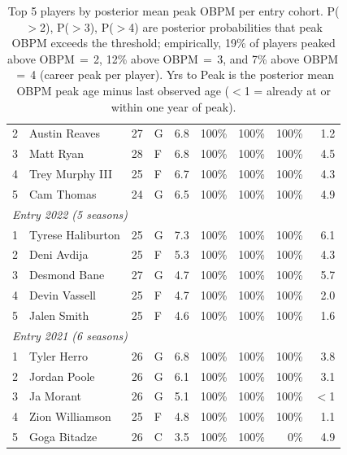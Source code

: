 \begin{table}[htbp]
\begin{tabular}{rlrlrrrrr}
    2 & Austin Reaves & 27 & G & 6.8 & 100\% & 100\% & 100\% & 1.2 \\
    3 & Matt Ryan & 28 & F & 6.8 & 100\% & 100\% & 100\% & 4.5 \\
    4 & Trey Murphy III & 25 & F & 6.7 & 100\% & 100\% & 100\% & 4.3 \\
    5 & Cam Thomas & 24 & G & 6.5 & 100\% & 100\% & 100\% & 4.9 \\
    \midrule[0.4pt]
    \multicolumn{9}{l}{\textit{Entry 2022 (5 seasons)}} \\
    \midrule
    1 & Tyrese Haliburton & 25 & G & 7.3 & 100\% & 100\% & 100\% & 6.1 \\
    2 & Deni Avdija & 25 & F & 5.3 & 100\% & 100\% & 100\% & 4.3 \\
    3 & Desmond Bane & 27 & G & 4.7 & 100\% & 100\% & 100\% & 5.7 \\
    4 & Devin Vassell & 25 & F & 4.7 & 100\% & 100\% & 100\% & 2.0 \\
    5 & Jalen Smith & 25 & F & 4.6 & 100\% & 100\% & 100\% & 1.6 \\
    \midrule[0.4pt]
    \multicolumn{9}{l}{\textit{Entry 2021 (6 seasons)}} \\
    \midrule
    1 & Tyler Herro & 26 & G & 6.8 & 100\% & 100\% & 100\% & 3.8 \\
    2 & Jordan Poole & 26 & G & 6.1 & 100\% & 100\% & 100\% & 3.1 \\
    3 & Ja Morant & 26 & G & 5.1 & 100\% & 100\% & 100\% & $<$1 \\
    4 & Zion Williamson & 25 & F & 4.8 & 100\% & 100\% & 100\% & 1.1 \\
    5 & Goga Bitadze & 26 & C & 3.5 & 100\% & 100\% & 0\% & 4.9 \\
    \bottomrule
  \end{tabular}
  \caption{Top 5 players by posterior mean peak OBPM per entry cohort. P($>$2), P($>$3), P($>$4) are posterior probabilities that peak OBPM exceeds the threshold; empirically, 19\% of players peaked above OBPM\,$=$\,2, 12\% above OBPM\,$=$\,3, and 7\% above OBPM\,$=$\,4 (career peak per player). Yrs to Peak is the posterior mean OBPM peak age minus last observed age ($<$1 = already at or within one year of peak).}
  \label{tab:breakout_cohort}
\end{table}

